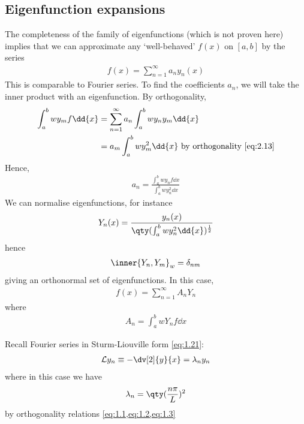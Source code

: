 \subsection{Eigenfunction expansions}
The completeness of the family of eigenfunctions (which is not proven here) implies that we can approximate any `well-behaved' $f(x)$ on $[a,b]$ by the series
\begin{align} \label{eq:2.16}
    f(x) = \sum_{n=1}^\infty a_n y_n(x)
\end{align}
This is comparable to Fourier series.
To find the coefficients $a_n$, we will take the inner product with an eigenfunction.
By orthogonality,
\begin{align*}
    \int_a^b w y_m f \dd{x} &= \sum_{n=1}^\infty a_n \int_a^b w y_n y_m \dd{x} \\
    &= a_m \int_a^b w y_m^2 \dd{x} \text{ by orthogonality \cref{eq:2.13}}
\end{align*}
Hence,
\begin{align} \label{eq:2.17}
    a_n = \frac{\int_a^b w y_n f \dd{x}}{\int_a^b w y_n^2 \dd{x}}
\end{align}
We can normalise eigenfunctions, for instance
\begin{align} \label{eq:2.18}
    Y_n(x) = \frac{y_n(x)}{\qty(\int_a^b w y_n^2 \dd{x})^{\frac{1}{2}}}
\end{align}
hence
\begin{align*}
    \inner{Y_n, Y_m}_w = \delta_{nm}
\end{align*}
giving an orthonormal set of eigenfunctions.
In this case,
\begin{align*}
    f(x) = \sum_{n=1}^\infty A_n Y_n
\end{align*}
where
\begin{align*}
    A_n = \int_a^b w Y_n f \dd{x}
\end{align*}
\begin{example}
    Recall Fourier series in Sturm-Liouville form \cref{eq:1.21}:
    \begin{align*} 
        \mathcal L y_n \equiv - \dv[2]{y}{x} = \lambda_n y_n
    \end{align*}
    where in this case we have
    \begin{align*}
        \lambda_n = \qty(\frac{n \pi}{L})^2
    \end{align*}
    by orthogonality relations \cref{eq:1.1,eq:1.2,eq:1.3}
\end{example}

